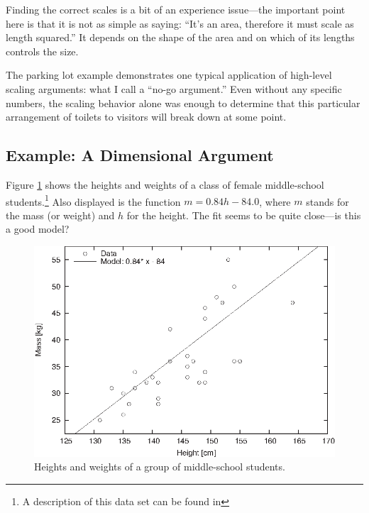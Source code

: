 Finding the correct scales is a bit of an experience issue---the
important point here is that it is not as simple as saying: ``It's an
area, therefore it must scale as length squared.'' It depends on the
shape of the area and on which of its lengths controls the size.


The parking lot example demonstrates one typical application of
high-level scaling arguments: what I call a ``no-go argument.'' Even
without any specific numbers, the scaling behavior alone was enough to
determine that this particular arrangement of toilets to visitors will
break down at some point.

\subsection{Example: A Dimensional Argument}

 
Figure \ref{fig:heightweight1} shows the heights and weights of a
class of female middle-school students.\footnote{A description of this
  data set can be found in }  Also displayed is the
function $m = 0.84 h - 84.0$, where $m$ stands for the mass (or
weight) and $h$ for the height. The fit seems to be quite close---is
this a good model?

\begin{figure}
  \centerline{\includegraphics{img/heightweight1}}
  \caption{Heights and weights of a group of middle-school students.}
  \label{fig:heightweight1}
\end{figure}

